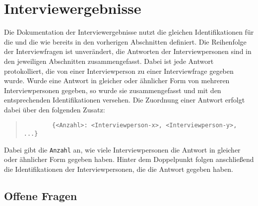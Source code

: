 \section{Interviewergebnisse}
\label{sec:AA-03_interview-results}

Die Dokumentation der Interviewergebnisse nutzt die gleichen Identifikationen für die  und die  wie bereits in den vorherigen Abschnitten definiert. Die Reihenfolge der Interviewfragen ist unverändert, die Antworten der Interviewpersonen sind in den jeweiligen Abschnitten zusammengefasst. Dabei ist jede Antwort protokolliert, die von einer Interviewperson zu einer Interviewfrage gegeben wurde. Wurde eine Antwort in gleicher oder ähnlicher Form von mehreren Interviewpersonen gegeben, so wurde sie zusammengefasst und mit den entsprechenden Identifikationen versehen. Die Zuordnung einer Antwort erfolgt dabei über den folgenden Zusatz:

\begin{quote}
    \begin{verbatim}
        {<Anzahl>: <Interviewperson-x>, <Interviewperson-y>, ...}
    \end{verbatim}
\end{quote}

Dabei gibt die \texttt{Anzahl} an, wie viele Interviewpersonen die Antwort in gleicher oder ähnlicher Form gegeben haben. Hinter dem Doppelpunkt folgen anschließend die Identifikationen der Interviewpersonen, die die Antwort gegeben haben.

\clearpage

\subsection{Offene Fragen}
\label{subsec:AA-03-01_open-questions}

